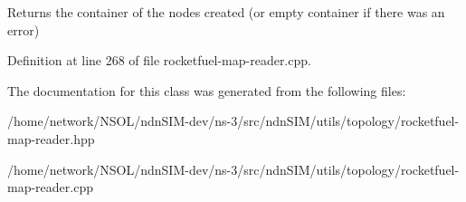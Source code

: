 \begin{DoxyReturn}{Returns}
the container of the nodes created (or empty container if there was an error) 
\end{DoxyReturn}


Definition at line 268 of file rocketfuel-\/map-\/reader.\+cpp.



The documentation for this class was generated from the following files\+:\begin{DoxyCompactItemize}
\item 
/home/network/\+N\+S\+O\+L/ndn\+S\+I\+M-\/dev/ns-\/3/src/ndn\+S\+I\+M/utils/topology/rocketfuel-\/map-\/reader.\+hpp\item 
/home/network/\+N\+S\+O\+L/ndn\+S\+I\+M-\/dev/ns-\/3/src/ndn\+S\+I\+M/utils/topology/rocketfuel-\/map-\/reader.\+cpp\end{DoxyCompactItemize}
